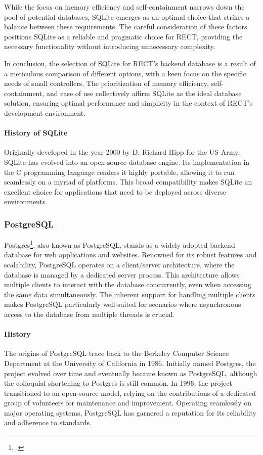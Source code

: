 While the focus on memory efficiency and self-containment narrows down the pool of potential databases, SQLite emerges as an optimal choice that strikes a 
balance between these requirements. The careful consideration of these factors positions SQLite as a reliable and pragmatic choice for RECT, providing the 
necessary functionality without introducing unnecessary complexity.\newline

In conclusion, the selection of SQLite for RECT's backend database is a result of a meticulous comparison of different options, with a keen focus on the 
specific needs of small controllers. The prioritization of memory efficiency, self-containment, and ease of use collectively affirm SQLite as the ideal database 
solution, ensuring optimal performance and simplicity in the context of RECT's development environment.

\paragraph{History of SQLite}
Originally developed in the year 2000 by D. Richard Hipp for the US Army, SQLite has evolved into an open-source database engine. Its implementation in the C 
programming language renders it highly portable, allowing it to run seamlessly on a myriad of platforms. This broad compatibility makes SQLite an excellent 
choice for applications that need to be deployed across diverse environments.\newline

\subsubsection{PostgreSQL}
Postgres\footcite{postgres}, also known as PostgreSQL, stands as a widely adopted backend database for web applications and websites. Renowned for its robust 
features and scalability, PostgreSQL operates on a client/server architecture, where the database is managed by a dedicated server process. This architecture 
allows multiple clients to interact with the database concurrently, even when accessing the same data simultaneously. The inherent support for handling multiple 
clients makes PostgreSQL particularly well-suited for scenarios where asynchronous access to the database from multiple threads is crucial.\newline

\paragraph{History}
The origins of PostgreSQL trace back to the Berkeley Computer Science Department at the University of California in 1986. Initially named Postgres, the project 
evolved over time and eventually became known as PostgreSQL, although the colloquial shortening to Postgres is still common. In 1996, the project transitioned 
to an open-source model, relying on the contributions of a dedicated group of volunteers for maintenance and improvement. Operating seamlessly on major 
operating systems, PostgreSQL has garnered a reputation for its reliability and adherence to standards.\newline

